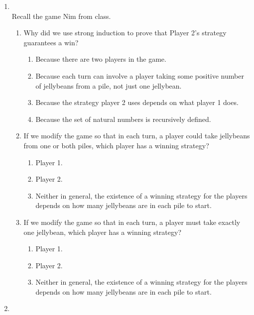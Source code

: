 \documentclass[12pt, oneside]{article}
\begin{document}
\begin{enumerate}
\item \hspace{1in}\\ 

Recall the game Nim from class.

\begin{enumerate}
    \item Why did we use strong induction to prove that Player 2's strategy guarantees a win?
    \begin{enumerate}
        \item Because there are two players in the game.
        \item Because each turn can involve a player taking some positive number 
        of jellybeans from a pile, not just one jellybean.
        \item Because the strategy player 2 uses depends on what player 1 does.
        \item Because the set of natural numbers is recursively defined.
    \end{enumerate}
    \item  If we modify the game so that in each turn, a player could take jellybeans
    from one or both piles, which player has a winning strategy?
    \begin{enumerate}
        \item Player 1.
        \item Player 2.
        \item Neither in general, the existence of a winning strategy for the players depends 
        on how many jellybeans are in each pile to start.
    \end{enumerate}
    \item  If we modify the game so that in each turn, a player must take 
    exactly one jellybean, which player has a winning strategy?
    \begin{enumerate}
        \item Player 1.
        \item Player 2.
        \item Neither in general, the existence of a winning strategy for the players depends 
        on how many jellybeans are in each pile to start.
    \end{enumerate}
\end{enumerate}
 \item \hspace{1in}\\ 


\end{enumerate}
\end{document}
